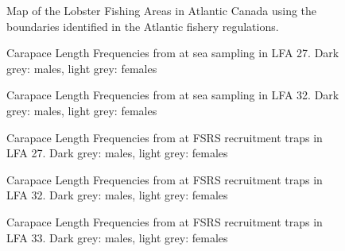 \documentclass[11pt]{article}
\newcommand{\e}{/bio_data/bio.lobster/figures/LFA2733Framework2018} %
\begin{document}
\begin{landscape}
\begin{figure}
\centering
    \caption{Map of the Lobster Fishing Areas in Atlantic Canada using the boundaries identified in the Atlantic fishery regulations.}

\end{figure}

\begin{figure}
\centering
    \caption{Carapace Length Frequencies from at sea sampling in LFA 27. Dark grey: males, light grey: females}

\end{figure}

\begin{figure}
\centering
    \caption{Carapace Length Frequencies from at sea sampling in LFA 32. Dark grey: males, light grey: females}

\end{figure}



\begin{figure}
\centering
    \caption{Carapace Length Frequencies from at FSRS recruitment traps in LFA 27. Dark grey: males, light grey: females}

\end{figure}


\begin{figure}
\centering
    \caption{Carapace Length Frequencies from at FSRS recruitment traps in LFA 32. Dark grey: males, light grey: females}

\end{figure}


\begin{figure}
\centering
    \caption{Carapace Length Frequencies from at FSRS recruitment traps in LFA 33. Dark grey: males, light grey: females}

\end{figure}




\end{landscape}
\end{document}
